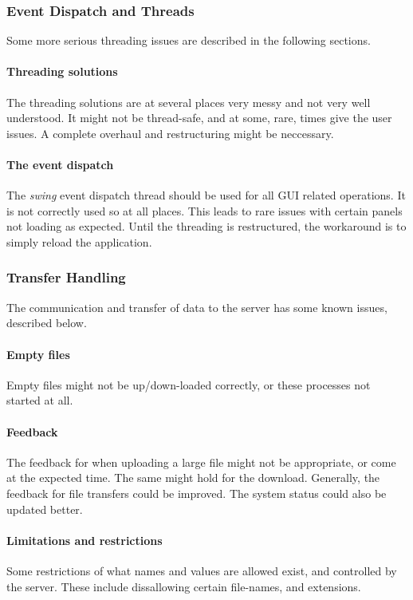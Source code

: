 \subsubsection{Event Dispatch and Threads}
	Some more serious threading issues are described in the following sections.

	\paragraph{ Threading solutions }
		The threading solutions are at several places very messy and not very well understood. It might not be thread-safe, and at some, rare, times give the user issues. A complete overhaul and restructuring might be neccessary.
		
	\paragraph{ The event dispatch }
		The \textit{swing} event dispatch thread should be used for all GUI related operations. It is not correctly used so at all places. This leads to rare issues with certain panels not loading as expected. 
		Until the threading is restructured, the workaround is to simply reload the application. 	
	

\subsubsection{Transfer Handling}
	The communication and transfer of data to the server has some known issues, described below.
		
		\paragraph{ Empty files }
			Empty files might not be up/down-loaded correctly, or these processes not started at all. 
			
		\paragraph{ Feedback }
			The feedback for when uploading a large file might not be appropriate, or come at the expected time. The same might hold for the download. Generally, the feedback for file transfers could be improved. The system status could also be updated better.
			
		\paragraph{ Limitations and restrictions }
			Some restrictions of what names and values are allowed exist, and controlled by the server. These include dissallowing certain file-names, and extensions.
			
				
		

	
	